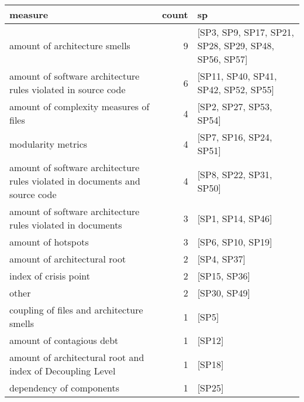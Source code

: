 \begin{tabular}{lrl}
\toprule
                                                                     measure &  count &                                                    sp \\
\midrule
                                               amount of architecture smells &      9 &  [SP3, SP9, SP17, SP21, SP28, SP29, SP48, SP56, SP57] \\
               amount of software architecture rules violated in source code &      6 &                  [SP11, SP40, SP41, SP42, SP52, SP55] \\
                                      amount of complexity measures of files &      4 &                               [SP2, SP27, SP53, SP54] \\
                                                          modularity metrics &      4 &                               [SP7, SP16, SP24, SP51] \\
 amount of software architecture rules violated in documents and source code &      4 &                               [SP8, SP22, SP31, SP50] \\
                 amount of software architecture rules violated in documents &      3 &                                     [SP1, SP14, SP46] \\
                                                          amount of hotspots &      3 &                                     [SP6, SP10, SP19] \\
                                                amount of architectural root &      2 &                                           [SP4, SP37] \\
                                                       index of crisis point &      2 &                                          [SP15, SP36] \\
                                                                       other &      2 &                                          [SP30, SP49] \\
                                   coupling of files and architecture smells &      1 &                                                 [SP5] \\
                                                   amount of contagious debt &      1 &                                                [SP12] \\
                  amount of architectural root and index of Decoupling Level &      1 &                                                [SP18] \\
                                                    dependency of components &      1 &                                                [SP25] \\
\bottomrule
\end{tabular}
